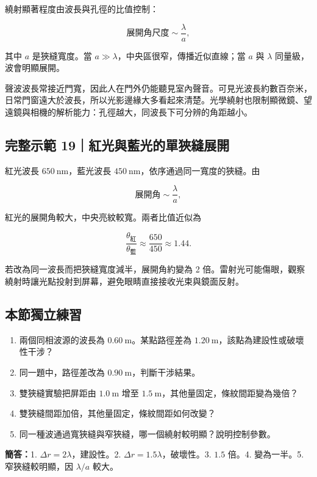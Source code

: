 \documentclass[11pt,a4paper]{article}
\providecommand{\tightlist}{%
  \setlength{\itemsep}{0pt}\setlength{\parskip}{0pt}}
\begin{document}
繞射顯著程度由波長與孔徑的比值控制：

\[
\text{展開角尺度}\sim\frac{\lambda}{a},
\]

其中 \(a\) 是狹縫寬度。當 \(a\gg\lambda\)，中央區很窄，傳播近似直線；當 \(a\) 與 \(\lambda\) 同量級，波會明顯展開。

聲波波長常接近門寬，因此人在門外仍能聽見室內聲音。可見光波長約數百奈米，日常門窗遠大於波長，所以光影邊緣大多看起來清楚。光學繞射也限制顯微鏡、望遠鏡與相機的解析能力：孔徑越大，同波長下可分辨的角距越小。

\begin{HandoutWorkedExample}

\subsection{完整示範 19｜紅光與藍光的單狹縫展開}\label{ux5b8cux6574ux793aux7bc4-19ux7d05ux5149ux8207ux85cdux5149ux7684ux55aeux72f9ux7e2bux5c55ux958b}

紅光波長 \(650\ \mathrm{nm}\)，藍光波長 \(450\ \mathrm{nm}\)，依序通過同一寬度的狹縫。由

\[
\text{展開角}\sim\frac{\lambda}{a},
\]

紅光的展開角較大，中央亮紋較寬。兩者比值近似為

\[
\frac{\theta_{\text{紅}}}{\theta_{\text{藍}}}
\approx\frac{650}{450}\approx1.44.
\]

若改為同一波長而把狹縫寬度減半，展開角約變為 2 倍。雷射光可能傷眼，觀察繞射時讓光點投射到屏幕，避免眼睛直接接收光束與鏡面反射。

\end{HandoutWorkedExample}

\begin{HandoutSelfCheck}

\subsection{本節獨立練習}\label{ux672cux7bc0ux7368ux7acbux7df4ux7fd2-5}

\begin{enumerate}
\def\labelenumi{\arabic{enumi}.}
\tightlist
\item
  兩個同相波源的波長為 \(0.60\ \mathrm m\)。某點路徑差為 \(1.20\ \mathrm m\)，該點為建設性或破壞性干涉？
\item
  同一題中，路徑差改為 \(0.90\ \mathrm m\)，判斷干涉結果。
\item
  雙狹縫實驗把屏距由 \(1.0\ \mathrm m\) 增至 \(1.5\ \mathrm m\)，其他量固定，條紋間距變為幾倍？
\item
  雙狹縫間距加倍，其他量固定，條紋間距如何改變？
\item
  同一種波通過寬狹縫與窄狹縫，哪一個繞射較明顯？說明控制參數。
\end{enumerate}

\textbf{簡答：}1. \(\Delta r=2\lambda\)，建設性。2. \(\Delta r=1.5\lambda\)，破壞性。3. \(1.5\) 倍。4. 變為一半。5. 窄狹縫較明顯，因 \(\lambda/a\) 較大。

\end{HandoutSelfCheck}
\end{document}
